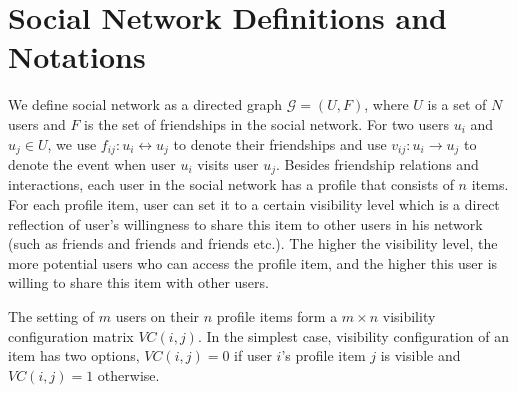 \documentclass[a4paper]{article}
\begin{document}
\section{Social Network Definitions and Notations}
We define social network as a directed graph $\mathcal{G}=(U,F)$,
where $U$ is a set of $N$ users and $F$ is the set of friendships in the
social network. For two users $u_i$ and $u_j\in U$, we use
$f_{ij}:u_i\leftrightarrow u_j$ to denote their friendships and use
$v_{ij}:u_i\rightarrow u_j$ to denote the event when user $u_i$ visits
user $u_j$.
Besides friendship relations and interactions, each user in the social
network has a profile that consists of $n$ items. For each profile
item, user can set it to a certain visibility level which is
a direct reflection of user's willingness to share this item to
other users in his network (such as friends and friends and
friends etc.). The higher the visibility level, the more potential
users who can access the profile item, and the higher this user is
willing to share this item with other users. 

The setting of $m$ users on their $n$ profile items form a $m\times n$
visibility configuration matrix $VC(i,j)$. In the simplest case,
visibility configuration of an item has two options, $VC(i,j)=0$ if
user $i$'s profile item $j$ is visible and $VC(i,j)=1$ otherwise. 

\end{document}
